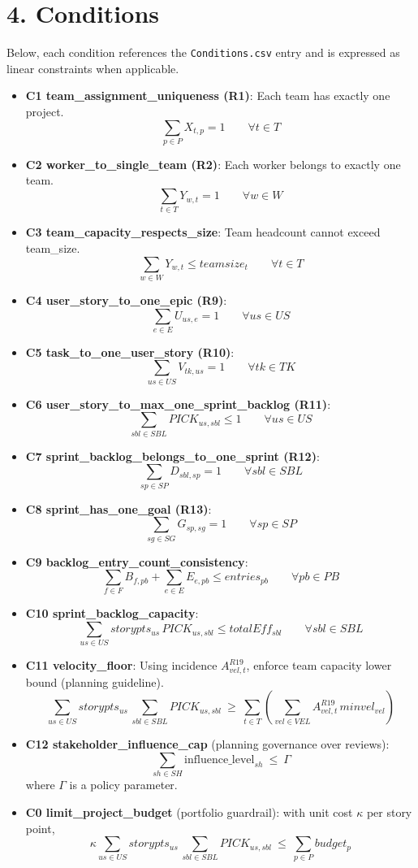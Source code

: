 \documentclass[11pt,a4paper]{article}
\begin{document}
\section{4. Conditions}
Below, each condition references the \texttt{Conditions.csv} entry and is expressed as linear constraints when applicable.

\begin{itemize}
  \item \textbf{C1 team\_assignment\_uniqueness (R1)}: Each team has exactly one project.
  \[
    \sum_{p\in P} X_{t,p} = 1 \qquad \forall t\in T
  \]
  \item \textbf{C2 worker\_to\_single\_team (R2)}: Each worker belongs to exactly one team.
  \[
    \sum_{t\in T} Y_{w,t} = 1 \qquad \forall w\in W
  \]
  \item \textbf{C3 team\_capacity\_respects\_size}: Team headcount cannot exceed team\_size.
  \[
    \sum_{w\in W} Y_{w,t} \le teamsize_t \qquad \forall t\in T
  \]
  \item \textbf{C4 user\_story\_to\_one\_epic (R9)}:
  \[
    \sum_{e\in E} U_{us,e} = 1 \qquad \forall us\in US
  \]
  \item \textbf{C5 task\_to\_one\_user\_story (R10)}:
  \[
    \sum_{us\in US} V_{tk,us} = 1 \qquad \forall tk\in TK
  \]
  \item \textbf{C6 user\_story\_to\_max\_one\_sprint\_backlog (R11)}:
  \[
    \sum_{sbl\in SBL} PICK_{us,sbl} \le 1 \qquad \forall us\in US
  \]
  \item \textbf{C7 sprint\_backlog\_belongs\_to\_one\_sprint (R12)}:
  \[
    \sum_{sp\in SP} D_{sbl,sp} = 1 \qquad \forall sbl\in SBL
  \]
  \item \textbf{C8 sprint\_has\_one\_goal (R13)}:
  \[
    \sum_{sg\in SG} G_{sp,sg} = 1 \qquad \forall sp\in SP
  \]
  \item \textbf{C9 backlog\_entry\_count\_consistency}:
  \[
    \sum_{f\in F} B_{f,pb} + \sum_{e\in E} E_{e,pb} \le entries_{pb} \qquad \forall pb\in PB
  \]
  \item \textbf{C10 sprint\_backlog\_capacity}:
  \[
    \sum_{us\in US} storypts_{us}\,PICK_{us,sbl} \le totalEff_{sbl} \qquad \forall sbl\in SBL
  \]
  \item \textbf{C11 velocity\_floor}: Using incidence $A^{R19}_{vel,t}$, enforce team capacity lower bound (planning guideline).
  \[
    \sum_{us\in US} storypts_{us}\,\sum_{sbl\in SBL} PICK_{us,sbl} \ \ge\ \sum_{t\in T}\left(\sum_{vel\in VEL} A^{R19}_{vel,t}\, minvel_{vel}\right)
  \]
  \item \textbf{C12 stakeholder\_influence\_cap} (planning governance over reviews):
  \[
    \sum_{sh\in SH} \mathrm{influence\_level}_{sh} \ \le\ \Gamma
  \]
  where $\Gamma$ is a policy parameter.
  \item \textbf{C0 limit\_project\_budget} (portfolio guardrail): with unit cost $\kappa$ per story point,
  \[
    \kappa \sum_{us\in US} storypts_{us}\,\sum_{sbl\in SBL} PICK_{us,sbl}\ \le\ \sum_{p\in P} budget_p
  \]
\end{itemize}
\end{document}
